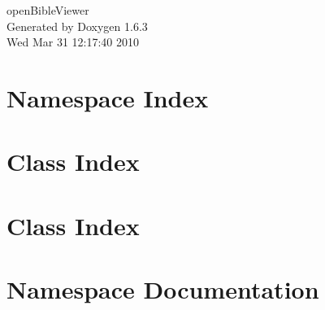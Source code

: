 \documentclass[a4paper]{book}
\begin{document}
\hypersetup{pageanchor=false}
\begin{titlepage}
\vspace*{7cm}
\begin{center}
{\Large openBibleViewer }\\
\vspace*{1cm}
{\large Generated by Doxygen 1.6.3}\\
\vspace*{0.5cm}
{\small Wed Mar 31 12:17:40 2010}\\
\end{center}
\end{titlepage}
\clearemptydoublepage
{}
\tableofcontents
\clearemptydoublepage
{}
\hypersetup{pageanchor=true}
\chapter{Namespace Index}

\chapter{Class Index}

\chapter{Class Index}

\chapter{Namespace Documentation}

\end{document}
